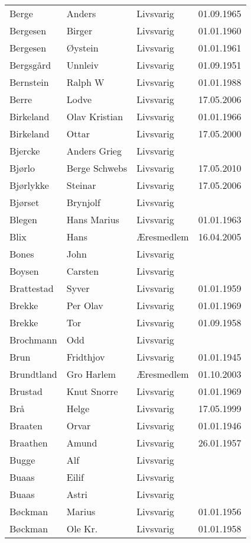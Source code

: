 \begin{longtable}{llll}
Berge	&	Anders	&	Livsvarig 	&	01.09.1965	\\
Bergesen	&	Birger	&	Livsvarig 	&	01.01.1960	\\
Bergesen	&	Øystein	&	Livsvarig 	&	01.01.1961	\\
Bergsgård	&	Unnleiv	&	Livsvarig 	&	01.09.1951	\\
Bernstein	&	Ralph W	&	Livsvarig 	&	01.01.1988	\\
Berre	&	Lodve	&	Livsvarig	&	17.05.2006	\\
Birkeland	&	Olav Kristian	&	Livsvarig 	&	01.01.1966	\\
Birkeland	&	Ottar	&	Livsvarig	&	17.05.2000	\\
Bjercke	&	Anders Grieg	&	Livsvarig 	&		\\
Bjørlo	&	Berge Schwebs	&	Livsvarig	&	17.05.2010	\\
Bjørlykke	&	Steinar	&	Livsvarig	&	17.05.2006	\\
Bjørset	&	Brynjolf	&	Livsvarig 	&		\\
Blegen	&	Hans Marius	&	Livsvarig 	&	01.01.1963	\\
Blix	&	Hans	&	Æresmedlem	&	16.04.2005	\\
Bones	&	John	&	Livsvarig 	&		\\
Boysen	&	Carsten	&	Livsvarig 	&		\\
Brattestad	&	Syver	&	Livsvarig 	&	01.01.1959	\\
Brekke	&	Per Olav	&	Livsvarig 	&	01.01.1969	\\
Brekke	&	Tor	&	Livsvarig 	&	01.09.1958	\\
Brochmann	&	Odd	&	Livsvarig 	&		\\
Brun	&	Fridthjov	&	Livsvarig 	&	01.01.1945	\\
Brundtland 	&	Gro Harlem 	&	Æresmedlem	&	01.10.2003	\\
Brustad	&	Knut Snorre	&	Livsvarig 	&	01.01.1969	\\
Brå 	&	Helge	&	Livsvarig	&	17.05.1999	\\
Braaten	&	Orvar	&	Livsvarig 	&	01.01.1946	\\
Braathen	&	Amund	&	Livsvarig 	&	26.01.1957	\\
Bugge	&	Alf	&	Livsvarig 	&		\\
Buaas	&	Eilif	&	Livsvarig 	&		\\
Buaas	&	Astri	&	Livsvarig 	&		\\
Bøckman	&	Marius	&	Livsvarig 	&	01.01.1956	\\
Bøckman	&	Ole Kr. 	&	Livsvarig 	&	01.01.1958	\\

\end{longtable}
